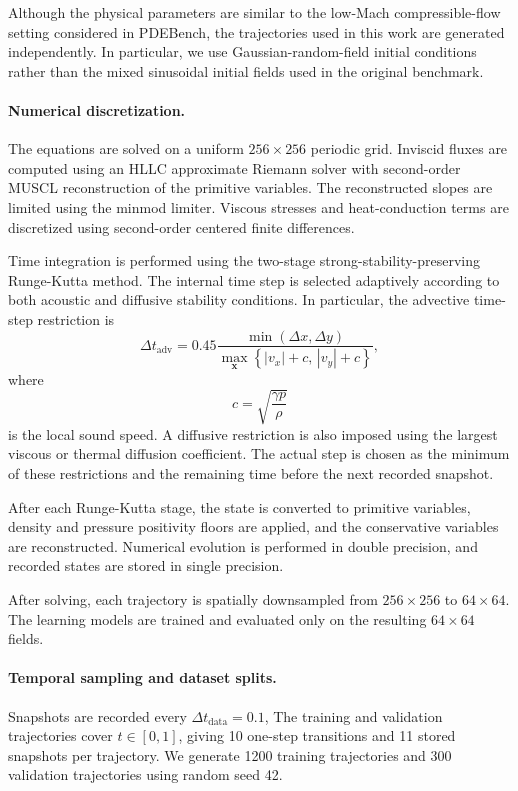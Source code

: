 \documentclass[11pt]{article}
\begin{document}
Although the physical parameters are similar to the low-Mach compressible-flow setting considered in PDEBench, the trajectories used in this work are generated independently. In particular, we use Gaussian-random-field initial conditions rather than the mixed sinusoidal initial fields used in the original benchmark.

\paragraph{Numerical discretization.}
The equations are solved on a uniform $256\times256$
periodic grid. Inviscid fluxes are computed using an HLLC approximate Riemann solver with second-order MUSCL reconstruction of the primitive variables. The reconstructed slopes are limited using the minmod limiter. Viscous stresses and heat-conduction terms are discretized using second-order centered finite differences.

Time integration is performed using the two-stage strong-stability-preserving Runge-Kutta method. The internal time step is selected adaptively according to both acoustic and diffusive stability conditions. In particular, the advective time-step restriction is
\[
    \Delta t_{\mathrm{adv}}
    =
    0.45
    \frac{
        \min(\Delta x,\Delta y)
    }{
        \max_{\mathbf{x}}
        \left\{
            |v_x|+c,\,
            |v_y|+c
        \right\}
    },
\]
where
\[
    c=\sqrt{\frac{\gamma p}{\rho}}
\]
is the local sound speed. A diffusive restriction is also imposed using the largest viscous or thermal diffusion coefficient. The actual step is chosen as the minimum of these restrictions and the remaining time before the next recorded snapshot.

After each Runge-Kutta stage, the state is converted to primitive variables, density and pressure positivity floors are applied, and the conservative variables are reconstructed. Numerical evolution is performed in double precision, and recorded states are stored in single precision.

After solving, each trajectory is spatially downsampled from
$256\times256$ to $64\times64$. The learning models are trained and evaluated only on the resulting $64\times64$ fields.

\paragraph{Temporal sampling and dataset splits.}
Snapshots are recorded every $\Delta t_{\mathrm{data}}=0.1$, The training and validation trajectories cover $t\in[0,1]$, giving 10 one-step transitions and 11 stored snapshots per trajectory. We generate 1200 training trajectories and 300 validation trajectories using random seed 42.
\end{document}

